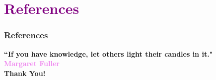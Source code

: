 \documentclass[aspectratio=169]{beamer}
\begin{document}

\section{\textbf{\textcolor{purple}{References}}}
\begin{frame}[allowframebreaks]
  \frametitle{References}
  
  
\end{frame}


\begin{frame}{}
    \begin{center}
        \textbf{\textcolor{blue!70}{\huge ``If you have knowledge, let others light their candles in it."}}\\ 
        \vspace{5mm}
        \textbf{\textcolor{violet}{\large Margaret Fuller}} \\
        \vspace{10mm}
        \textbf{\textcolor{teal!80}{\huge  Thank You!}}
    \end{center}
\end{frame}
\end{document}
